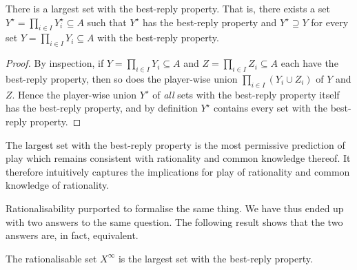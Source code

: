 \begin{observation}
	\label{observation:br_property_max}
	There is a largest set with the best-reply property. That is, there exists a set $Y^\star = \prod_{i \in I} Y^\star_i \subseteq A$ such that $Y^\star$ has the best-reply property and $Y^\star \supseteq Y$ for every set $Y = \prod_{i \in I} Y_i \subseteq A$ with the best-reply property.
\end{observation}

\begin{proof}
	By inspection, if $Y = \prod_{i \in I} Y_i \subseteq A$ and $Z = \prod_{i \in I} Z_i \subseteq A$ each have the best-reply property, then so does the player-wise union $\prod_{i \in I} ( Y_i \cup Z_i )$ of $Y$ and $Z$. Hence the player-wise union $Y^\star$ of \emph{all} sets with the best-reply property itself has the best-reply property, and by definition $Y^\star$ contains every set with the best-reply property.
\end{proof}

The largest set with the best-reply property is the most permissive prediction of play which remains consistent with rationality and common knowledge thereof. It therefore intuitively captures the implications for play of rationality and common knowledge of rationality.

Rationalisability purported to formalise the same thing. We have thus ended up with two answers to the same question. The following result shows that the two answers are, in fact, equivalent.

\begin{proposition}
	\label{proposition:br_property}
	The rationalisable set $X^\infty$ is the largest set with the best-reply property.
\end{proposition}

